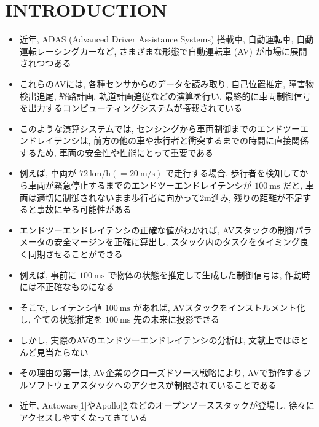 
\section{INTRODUCTION}
\label{sec: introduction}

\begin{frame}{}
    \begin{itemize}
        \item 近年, ADAS (Advanced Driver Assistance Systems) 搭載車, 自動運転車, 自動運転レーシングカーなど, さまざまな形態で自動運転車 (AV) が市場に展開されつつある
        \item これらのAVには, 各種センサからのデータを読み取り, 自己位置推定, 障害物検出追尾, 経路計画, 軌道計画追従などの演算を行い, 最終的に車両制御信号を出力するコンピューティングシステムが搭載されている
        \item このような演算システムでは, センシングから車両制御までのエンドツーエンドレイテンシは, 前方の他の車や歩行者と衝突するまでの時間に直接関係するため, 車両の安全性や性能にとって重要である
    \end{itemize}
\end{frame}

\begin{frame}{}
    \begin{itemize}
        \item 例えば, 車両が $72 \mathrm{~km} / \mathrm{h}(=20 \mathrm{~m} / \mathrm{s})$ で走行する場合, 歩行者を検知してから車両が緊急停止するまでのエンドツーエンドレイテンシが $100 \mathrm{~ms}$ だと, 車両は適切に制御されないまま歩行者に向かって2m進み, 残りの距離が不足すると事故に至る可能性がある
        \item エンドツーエンドレイテンシの正確な値がわかれば, AVスタックの制御パラメータの安全マージンを正確に算出し, スタック内のタスクをタイミング良く同期させることができる
        \item 例えば, 事前に $100 \mathrm{~ms}$ で物体の状態を推定して生成した制御信号は, 作動時には不正確なものになる
        \item そこで, レイテンシ値 $100 \mathrm{~ms}$ があれば, AVスタックをインストルメント化し, 全ての状態推定を $100 \mathrm{~ms}$ 先の未来に投影できる
    \end{itemize}
\end{frame}

\begin{frame}{}
    \begin{itemize}
        \item しかし, 実際のAVのエンドツーエンドレイテンシの分析は, 文献上ではほとんど見当たらない
        \item その理由の第一は, AV企業のクローズドソース戦略により, AVで動作するフルソフトウェアスタックへのアクセスが制限されていることである
        \item 近年, Autoware[1]やApollo[2]などのオープンソーススタックが登場し, 徐々にアクセスしやすくなってきている
    \end{itemize}
\end{frame}

